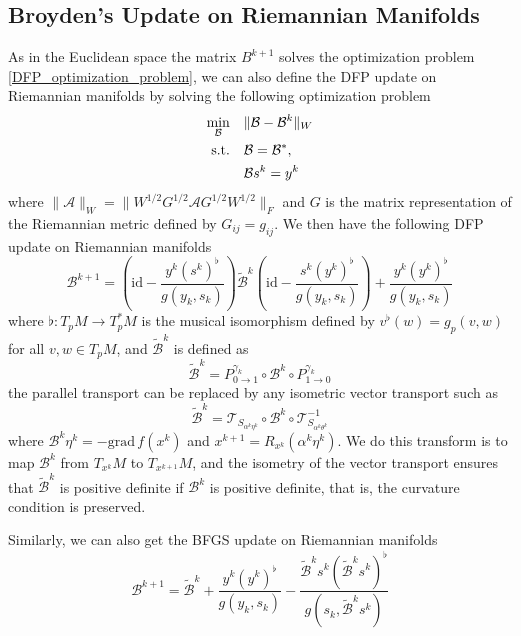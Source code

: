 \documentclass[12pt,a4paper,draft]{article}  %
\theoremstyle{definition}
\numberwithin{equation}{section}
\newcommand{\adj}{*}
\newcommand{\st}{\textnormal{s.t.}}
\newcommand{\grad}{\mathrm{grad}\,}
\newcommand{\VT}{\mathcal{T}}
\begin{document}
\subsection{Broyden's Update on Riemannian Manifolds}
As in the Euclidean space the matrix $B^{k+1}$ solves the optimization problem \eqref{DFP_optimization_problem}, we can also define the DFP update on Riemannian manifolds by solving the following optimization problem
\begin{equation}\label{DFP_optimization_problem_riemannian}
        \begin{aligned}
                \min_{\mathcal{B}} &\quad \|\mathcal{B} - \mathcal{B}^k\|_W \\
                \st &\quad \mathcal{B} = \mathcal{B}^\adj, \\
                &\quad \mathcal{B} s^k = y^k
        \end{aligned}
\end{equation}
where $\|\mathcal{A}\|_W = \|W^{1/2}G^{1/2}\mathcal{A}G^{1/2}W^{1/2}\|_F$ and $G$ is the matrix representation of the Riemannian metric defined by $G_{ij} = g_{ij}$. We then have the following DFP update on Riemannian manifolds
\begin{equation}\label{DFP_update_riemannian}
        \mathcal{B}^{k+1} = \left(\mathrm{id} - \frac{y^k(s^k)^\flat}{g(y_k,s_k)}\right) \tilde{\mathcal{B}}^k \left(\mathrm{id} - \frac{s^k(y^k)^\flat}{g(y_k,s_k)}\right) + \frac{y^k (y^k)^\flat}{g(y_k,s_k)}
\end{equation}
where $\flat: T_p M \to T_p^* M$ is the musical isomorphism defined by $v^\flat(w) = g_p(v,w)$ for all $v,w \in T_p M$, and $\tilde{\mathcal{B}}^k$ is defined as
\[
\tilde{\mathcal{B}}^k = P_{0\to1}^{\gamma_k} \circ \mathcal{B}^k \circ P_{1\to0}^{\gamma_k}
\]
the parallel transport can be replaced by any isometric vector transport such as
\begin{equation}
        \tilde{\mathcal{B}}^k = \VT_{S_{\alpha^k\eta^k}} \circ \mathcal{B}^k \circ \VT_{S_{\alpha^k\theta^k}}^{-1}
\end{equation}
where $\mathcal{B}^k\eta^k = -\grad f(x^k)$ and $x^{k+1} = R_{x^k}(\alpha^k\eta^k)$. We do this transform is to map $\mathcal{B}^k$ from $T_{x^k} M$ to $T_{x^{k+1}} M$, and the isometry of the vector transport ensures that $\tilde{\mathcal{B}}^k$ is positive definite if $\mathcal{B}^k$ is positive definite, that is, the curvature condition is preserved.

Similarly, we can also get the BFGS update on Riemannian manifolds 
\begin{equation}\label{BFGS_update_riemannian}
        \mathcal{B}^{k+1} = \tilde{\mathcal{B}}^k + \frac{y^k (y^k)^\flat}{g(y_k,s_k)} - \frac{\tilde{\mathcal{B}}^k s^k (\tilde{\mathcal{B}}^ks^k)^\flat }{g(s_k, \tilde{\mathcal{B}}^k s^k)}
\end{equation}
\end{document}
